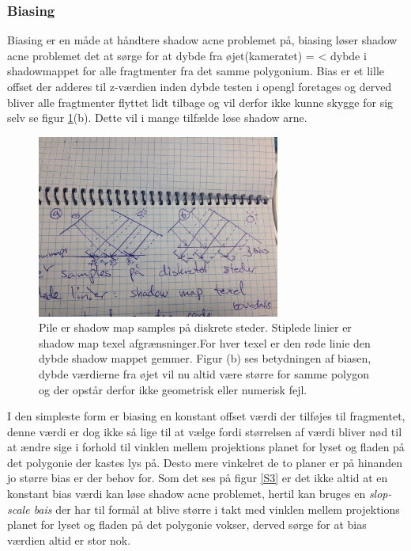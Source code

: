 \documentclass[11pt,a4paper]{article}
\begin{document}
\subsubsection{Biasing}

Biasing er en måde at håndtere shadow acne problemet på, biasing løser shadow acne problemet det at sørge for at dybde fra øjet(kameratet) = < dybde i shadowmappet for alle fragtmenter fra det samme polygonium.  Bias er et lille offset der adderes til z-værdien inden dybde testen i opengl foretages og derved bliver alle fragtmenter flyttet lidt tilbage og vil derfor ikke kunne skygge for sig selv se figur \ref{S2}(b). Dette vil i mange tilfælde løse shadow arne.

\begin{figure}[ht!]
\centering
\includegraphics[width=80mm]{img/S2.jpg}
\caption{Pile er shadow map samples på diskrete steder. Stiplede linier er shadow map texel afgrænsninger.For hver texel er den røde linie den dybde shadow mappet gemmer. Figur (b) ses betydningen af biasen, dybde værdierne fra øjet vil nu altid være større for samme polygon og der opstår derfor ikke geometrisk eller numerisk fejl.}
\label{S2}
\end{figure}

I den simpleste form er biasing en konstant offset værdi der tilføjes til fragmentet, denne værdi er dog ikke så lige til at vælge fordi størrelsen af  værdi bliver nød til at ændre sige i forhold til vinklen mellem projektions planet for lyset og fladen på det polygonie der kastes lys på. Desto mere vinkelret de to planer er på hinanden jo større bias er der behov for. Som det ses på figur \ref{S3} er det ikke altid at en konstant bias værdi kan løse shadow acne problemet, hertil kan bruges en \textit{slop-scale bais} der har til formål at blive større i takt med vinklen mellem  projektions planet for lyset og fladen på det polygonie vokser, derved sørge for at bias værdien altid er stor nok. 
\end{document}
